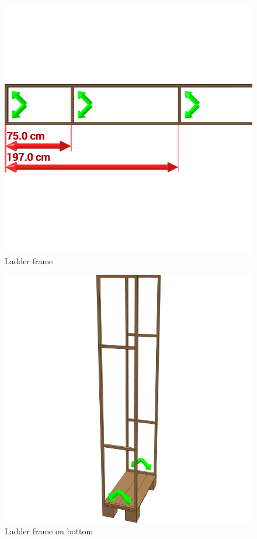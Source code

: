 \documentclass{article}
\begin{document}
\begin{figure}[h!]
    \centering
    \includegraphics[width=\textwidth]{scene 3 - ladder.png}
    \caption{Ladder frame}
\end{figure}

\begin{figure}[h!]
    \centering
    \includegraphics[width=\textwidth]{scene 4 - geraamte.png}
    \caption{Ladder frame on bottom}
\end{figure}
\end{document}
